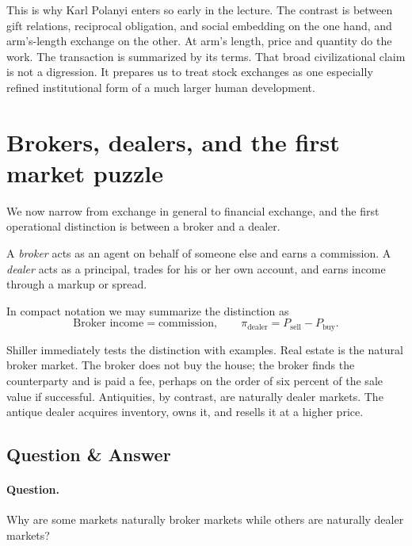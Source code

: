 This is why Karl Polanyi enters so early in the lecture. The contrast is between gift relations, reciprocal obligation, and social embedding on the one hand, and arm's-length exchange on the other. At arm's length, price and quantity do the work. The transaction is summarized by its terms. That broad civilizational claim is not a digression. It prepares us to treat stock exchanges as one especially refined institutional form of a much larger human development.

\section{Brokers, dealers, and the first market puzzle}

We now narrow from exchange in general to financial exchange, and the first operational distinction is between a broker and a dealer.

\begin{definition}
A \emph{broker} acts as an agent on behalf of someone else and earns a commission. A \emph{dealer} acts as a principal, trades for his or her own account, and earns income through a markup or spread.
\end{definition}

In compact notation we may summarize the distinction as
\begin{equation}
\text{Broker income} = \text{commission},
\qquad
\pi_{\text{dealer}} = P_{\text{sell}} - P_{\text{buy}}.
\end{equation}

Shiller immediately tests the distinction with examples. Real estate is the natural broker market. The broker does not buy the house; the broker finds the counterparty and is paid a fee, perhaps on the order of six percent of the sale value if successful. Antiquities, by contrast, are naturally dealer markets. The antique dealer acquires inventory, owns it, and resells it at a higher price.

\subsection{Question \& Answer}

\paragraph{Question.} Why are some markets naturally broker markets while others are naturally dealer markets?

